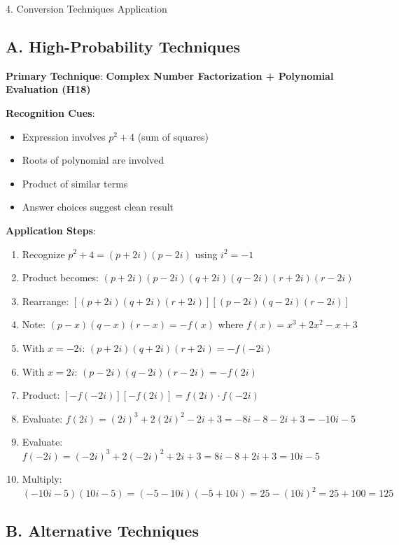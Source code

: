 \documentclass[12pt]{article}
\begin{document}
\begin{conversionbox}{4. Conversion Techniques Application}

\subsection*{A. High-Probability Techniques}

\textbf{Primary Technique}: \textbf{Complex Number Factorization + Polynomial Evaluation (H18)}

\textbf{Recognition Cues}:
\begin{itemize}
    \item Expression involves $p^2 + 4$ (sum of squares)
    \item Roots of polynomial are involved
    \item Product of similar terms
    \item Answer choices suggest clean result
\end{itemize}

\textbf{Application Steps}:
\begin{enumerate}
    \item Recognize $p^2 + 4 = (p + 2i)(p - 2i)$ using $i^2 = -1$
    \item Product becomes: $(p + 2i)(p - 2i)(q + 2i)(q - 2i)(r + 2i)(r - 2i)$
    \item Rearrange: $[(p + 2i)(q + 2i)(r + 2i)][(p - 2i)(q - 2i)(r - 2i)]$
    \item Note: $(p - x)(q - x)(r - x) = -f(x)$ where $f(x) = x^3 + 2x^2 - x + 3$
    \item With $x = -2i$: $(p + 2i)(q + 2i)(r + 2i) = -f(-2i)$
    \item With $x = 2i$: $(p - 2i)(q - 2i)(r - 2i) = -f(2i)$
    \item Product: $[-f(-2i)][-f(2i)] = f(2i) \cdot f(-2i)$
    \item Evaluate: $f(2i) = (2i)^3 + 2(2i)^2 - 2i + 3 = -8i - 8 - 2i + 3 = -10i - 5$
    \item Evaluate: $f(-2i) = (-2i)^3 + 2(-2i)^2 + 2i + 3 = 8i - 8 + 2i + 3 = 10i - 5$
    \item Multiply: $(-10i - 5)(10i - 5) = (-5 - 10i)(-5 + 10i) = 25 - (10i)^2 = 25 + 100 = 125$
\end{enumerate}

\subsection*{B. Alternative Techniques}


\end{conversionbox}
\end{document}

